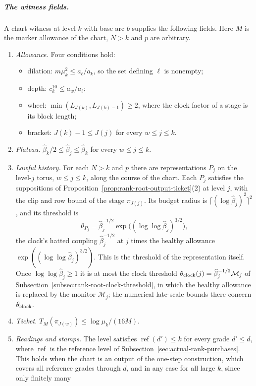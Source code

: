 \subparagraph{The witness fields.}
A chart witness at level $k$ with base arc $b$ supplies the following
fields. Here $M$ is the marker allowance of the chart, $N>k$ and $p$ are
arbitrary.
\begin{enumerate}
\item[(F1)] \emph{Allowance.} Four conditions hold:
 \begin{itemize}
 \item dilation: $m\mu_k^2\le a_\ell/a_k$, so the set defining $\ell$
  is nonempty;
 \item depth: $c_k^{10}\le a_w/a_\ell$;
 \item wheel: $\min(L_{J(k)},L_{J(k)-1})\ge2$, where the clock factor of a
  stage is its block length;
 \item bracket: $J(k)-1\le J(j)$ for every $w\le j\le k$.
 \end{itemize}
\item[(F2)] \emph{Plateau.} $\widehat\beta_k/2\le\widehat\beta_j\le\widehat\beta_k$
 for every $w\le j\le k$.
\item[(F3)] \emph{Lawful history.} For each $N>k$ and $p$ there are
 representations $P_j$ on the level-$j$ torus, $w\le j\le k$, along the
 course of the chart. Each $P_j$ satisfies the suppositions of
 Proposition~\ref{prop:rank-root-output-ticket}(2) at level $j$, with the
 clip and row bound of the stage $\pi_{J(j)}$. Its budget radius is
 $\lceil(\log\widehat\beta_j)^2\rceil^2$, and its threshold is
 \[
  \theta_{P_j}=\widehat\beta_j^{-1/2}\exp\bigl((\log\log\widehat\beta_j)^{3/2}\bigr),
 \]
 the clock's hatted coupling $\widehat\beta_j^{-1/2}$ at $j$ times the
 healthy allowance $\exp((\log\log\widehat\beta_j)^{3/2})$. This is the
 threshold of the representation itself. Once $\log\log\widehat\beta_j\ge1$ it is at most the clock
 threshold $\theta_{\rm clock}(j)=\widehat\beta_j^{-1/2}\mathcal M_j$ of
 Subsection~\ref{subsec:rank-root-clock-threshold}, in which the healthy
 allowance is replaced by the monitor $\mathcal M_j$; the numerical
 late-scale bounds there concern $\theta_{\rm clock}$.
\item[(F4)] \emph{Ticket.} $T_M(\pi_{J(w)})\le\log\mu_k/(16M)$.
\item[(F5)] \emph{Readings and stamps.} The level satisfies
 $\operatorname{ref}(d')\le k$ for every grade $d'\le d$, where
 $\operatorname{ref}$ is the reference level of
 Subsection~\ref{sec:actual-rank-purchases}. This holds when the chart is an
 output of the one-step construction, which covers all reference grades
 through $d$, and in any case for all large $k$, since only finitely many

\end{enumerate}

